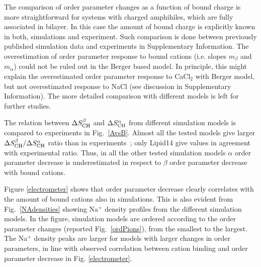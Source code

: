 \documentclass[pre,aps,floatfix,authordate1-4,twocolumn]{revtex4-1}
\begin{document}
The comparison of order parameter changes as a function of bound charge is more straightforward for
systems with charged amphihiles, which are fully associated in bilayer. In this case the amount of bound charge
is explicitly known in both, simulations and experiment. Such comparison is done 
between previously published simulation data \cite{miettinen09} and experiments \cite{scherer89,franzin98}
in Supplementary Information. The overestimation of order parameter response to bound cations (i.e. slopes $m_\beta$ and $m_\alpha$)
could not be ruled out in the Berger based model. In principle, this might explain the overestimated order parameter 
response to CaCl$_2$ with Berger model, but not overestimated response to NaCl (see discussion in Supplementary Information).
The more detailed comparison with different models is left for further studies.





The relation between $\Delta S_{\rm{CH}}^{\beta}$ and $\Delta S_{\rm{CH}}^{\alpha}$ from different simulation models
is compared to experiments in Fig.~\ref{AvsB}. Almost all the tested models give larger $\Delta S_{\rm{CH}}^{\beta}/\Delta S_{\rm{CH}}^{\alpha}$ ratio
than in experiments~\cite{akutsu81}; only Lipid14 give values in agreement with experimental ratio.
Thus, in all the other tested simulation models $\alpha$ order parameter decrease is underestimated in
respect to $\beta$ order parameter decrease with bound cations.

Figure \ref{electrometer} shows that order parameter decrease clearly correlates with the
amount of bound cations also in simulations. This is also evident from Fig.~\ref{NAdensities}
showing Na$^+$ density profiles from the different simulation models. 
In the figure, simulation models are ordered according to the order parameter changes 
(reported Fig.~\ref{ordPions}), from the smallest to the largest.
The Na$^+$ density peaks are larger for models with larger changes in order parameters,
in line with observed correlation between cation binding and order parameter decrease in
Fig. \ref{electrometer}.
\end{document}
